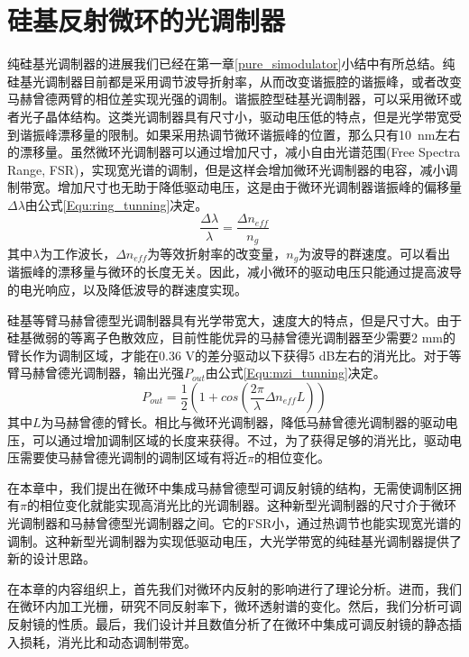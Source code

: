 \chapter{硅基反射微环的光调制器}
纯硅基光调制器的进展我们已经在第一章\ref{pure_simodulator}小结中有所总结。纯硅基光调制器目前都是采用调节波导折射率，从而改变谐振腔的谐振峰，或者改变马赫曾德两臂的相位差实现光强的调制。谐振腔型硅基光调制器，可以采用微环或者光子晶体结构。这类光调制器具有尺寸小，驱动电压低的特点，但是光学带宽受到谐振峰漂移量的限制。如果采用热调节微环谐振峰的位置，那么只有10~nm左右的漂移量。虽然微环光调制器可以通过增加尺寸，减小自由光谱范围(Free Spectra Range, FSR)，实现宽光谱的调制，但是这样会增加微环光调制器的电容，减小调制带宽。增加尺寸也无助于降低驱动电压，这是由于微环光调制器谐振峰的偏移量$\Delta \lambda$由公式\ref{Equ:ring_tunning}决定。
\begin{equation}
\label{Equ:ring_tunning}
\frac{\Delta \lambda}{\lambda} = \frac{\Delta n_{eff}}{n_g}
\end{equation}
其中$\lambda$为工作波长，$\Delta n_{eff}$为等效折射率的改变量，$n_g$为波导的群速度。可以看出谐振峰的漂移量与微环的长度无关。因此，减小微环的驱动电压只能通过提高波导的电光响应，以及降低波导的群速度实现。

硅基等臂马赫曾德型光调制器具有光学带宽大，速度大的特点，但是尺寸大。由于硅基微弱的等离子色散效应，目前性能优异的马赫曾德光调制器至少需要2 mm的臂长作为调制区域，才能在0.36 V的差分驱动以下获得5 dB左右的消光比\cite{Ding2013electro}。对于等臂马赫曾德光调制器，输出光强$P_{out}$由公式\ref{Equ:mzi_tunning}决定。
\begin{equation}
\label{Equ:mzi_tunning}
P_{out} = \frac{1}{2}\left(1+cos\left(\frac{2\pi}{\lambda}\Delta n_{eff}L\right)\right)
\end{equation}
其中$L$为马赫曾德的臂长。相比与微环光调制器，降低马赫曾德光调制器的驱动电压，可以通过增加调制区域的长度来获得。不过，为了获得足够的消光比，驱动电压需要使马赫曾德光调制的调制区域有将近$\pi$的相位变化。

在本章中，我们提出在微环中集成马赫曾德型可调反射镜的结构，无需使调制区拥有$\pi$的相位变化就能实现高消光比的光调制器。这种新型光调制器的尺寸介于微环光调制器和马赫曾德型光调制器之间。它的FSR小，通过热调节也能实现宽光谱的调制。这种新型光调制器为实现低驱动电压，大光学带宽的纯硅基光调制器提供了新的设计思路。

在本章的内容组织上，首先我们对微环内反射的影响进行了理论分析。进而，我们在微环内加工光栅，研究不同反射率下，微环透射谱的变化。然后，我们分析可调反射镜的性质。最后，我们设计并且数值分析了在微环中集成可调反射镜的静态插入损耗，消光比和动态调制带宽。

